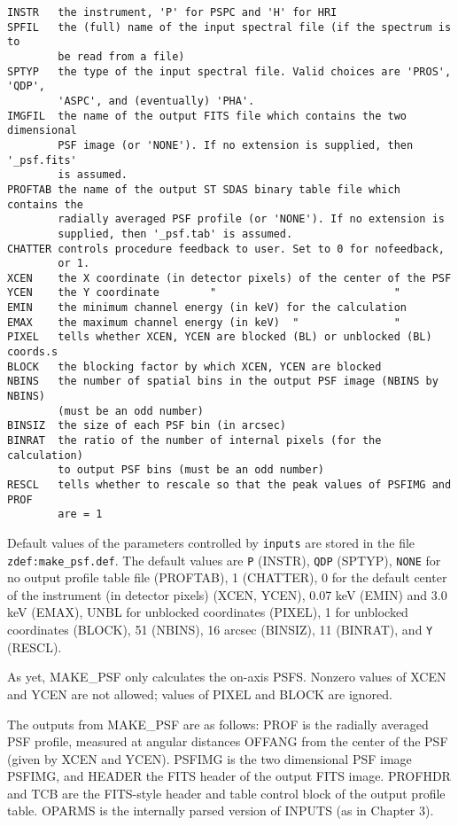\medskip\noindent
\begin{verbatim}
INSTR   the instrument, 'P' for PSPC and 'H' for HRI
SPFIL   the (full) name of the input spectral file (if the spectrum is to
        be read from a file)
SPTYP   the type of the input spectral file. Valid choices are 'PROS', 'QDP',
        'ASPC', and (eventually) 'PHA'.
IMGFIL  the name of the output FITS file which contains the two dimensional
        PSF image (or 'NONE'). If no extension is supplied, then '_psf.fits'
        is assumed.
PROFTAB the name of the output ST SDAS binary table file which contains the
        radially averaged PSF profile (or 'NONE'). If no extension is
        supplied, then '_psf.tab' is assumed.
CHATTER controls procedure feedback to user. Set to 0 for nofeedback,
        or 1.
XCEN    the X coordinate (in detector pixels) of the center of the PSF
YCEN    the Y coordinate        "                            "
EMIN    the minimum channel energy (in keV) for the calculation
EMAX    the maximum channel energy (in keV)  "               "
PIXEL   tells whether XCEN, YCEN are blocked (BL) or unblocked (BL) coords.s
BLOCK   the blocking factor by which XCEN, YCEN are blocked
NBINS   the number of spatial bins in the output PSF image (NBINS by NBINS)
        (must be an odd number)
BINSIZ  the size of each PSF bin (in arcsec)
BINRAT  the ratio of the number of internal pixels (for the calculation)
        to output PSF bins (must be an odd number)
RESCL   tells whether to rescale so that the peak values of PSFIMG and PROF
        are = 1
\end{verbatim}
Default values of the parameters controlled by {\tt inputs} are stored in the file
{\tt zdef:make{\_}psf.def}. The default values are {\tt P} (INSTR), {\tt QDP} (SPTYP), {\tt NONE}
for no output profile table file (PROFTAB), 1 (CHATTER), 0 for the default
center of the instrument (in detector pixels) (XCEN, YCEN), 0.07 keV (EMIN) and
3.0 keV (EMAX), UNBL for unblocked coordinates (PIXEL), 1 for unblocked
coordinates (BLOCK), 51 (NBINS), 16 arcsec (BINSIZ), 11 (BINRAT), and {\tt Y}
(RESCL).
 
As yet, MAKE{\_}PSF only calculates the on-axis PSFS. Nonzero values of XCEN and
YCEN are not allowed; values of PIXEL and BLOCK are ignored.
 
The outputs from MAKE{\_}PSF are as follows: PROF is the radially averaged PSF
profile, measured at angular distances OFFANG from the center of the PSF (given
by XCEN and YCEN). PSFIMG is the two dimensional PSF image PSFIMG, and HEADER
the FITS header of the output FITS image. PROFHDR and TCB are the FITS-style
header and table control block of the output profile table. OPARMS is the
internally parsed version of INPUTS (as in Chapter 3).
 
